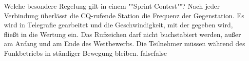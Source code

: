     {Welche besondere Regelung gilt in einem ""Sprint-Contest""?}
    {Nach jeder Verbindung überlässt die CQ-rufende Station die Frequenz der Gegenstation.}
    {Es wird in Telegrafie gearbeitet und die Geschwindigkeit, mit der gegeben wird, fließt in die Wertung ein.}
    {Das Rufzeichen darf nicht buchstabiert werden, außer am Anfang und am Ende des Wettbewerbs.}
    {Die Teilnehmer müssen während des Funkbetriebs in ständiger Bewegung bleiben.}
    {false}{false}